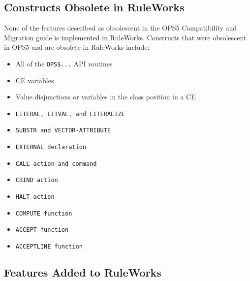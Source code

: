 \subsection{Constructs Obsolete in RuleWorks}

None of the features described as obsolescent in the OPS5
Compatibility and Migration guide is implemented in
RuleWorks. Constructs that were obsolescent in OPS5 and are obsolete
in RuleWorks include:
\begin{itemize}
\item All of the \verb|OPS$...| API routines

\item CE variables

\item Value disjunctions or variables in the class position in a CE

\item \tt{LITERAL}, \tt{LITVAL}, and \tt{LITERALIZE}

\item \tt{SUBSTR} and \tt{VECTOR-ATTRIBUTE}

\item \tt{EXTERNAL} declaration

\item \tt{CALL} action and command

\item \tt{CBIND} action

\item \tt{HALT} action

\item \tt{COMPUTE} function

\item \tt{ACCEPT} function

\item \tt{ACCEPTLINE} function
\end{itemize}
      
\subsection{Features Added to RuleWorks}

